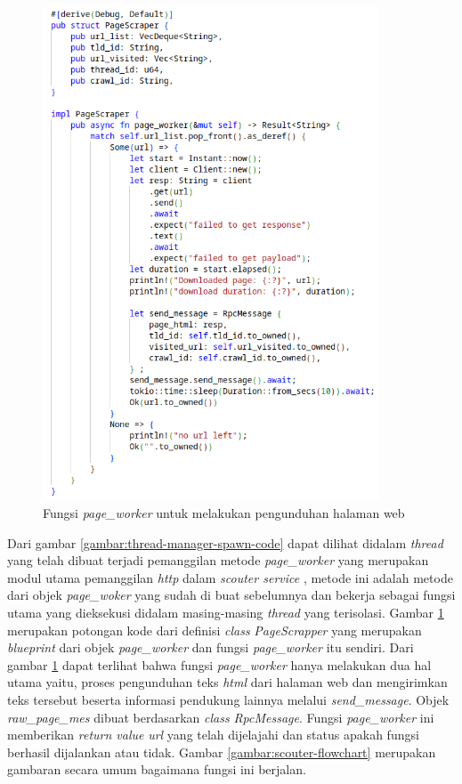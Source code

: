 \begin{figure}[H]
  \centering
  \includegraphics[keepaspectratio, width=10cm]{gambar/page_worker-code.png}
  \caption{ Fungsi \emph{page\_worker} untuk melakukan pengunduhan halaman web}
  \label{gambar:page-worker-code}
\end{figure}

Dari gambar \ref{gambar:thread-manager-spawn-code} dapat dilihat didalam \emph{thread} yang telah dibuat terjadi pemanggilan metode \emph{page\_worker} yang merupakan modul utama pemanggilan \emph{http} dalam \emph{scouter service} , metode ini adalah metode dari objek \emph{page\_woker} yang sudah di buat sebelumnya dan bekerja sebagai fungsi utama yang dieksekusi didalam masing-masing \emph{thread} yang terisolasi. Gambar \ref{gambar:page-worker-code} merupakan potongan kode dari definisi \emph{class} \emph{PageScrapper} yang merupakan \emph{blueprint} dari objek \emph{page\_worker} dan fungsi \emph{page\_worker} itu sendiri. Dari gambar \ref{gambar:page-worker-code} dapat terlihat bahwa fungsi \emph{page\_worker} hanya melakukan dua hal utama yaitu, proses pengunduhan teks \emph{html} dari halaman web dan mengirimkan teks tersebut beserta informasi pendukung lainnya melalui \emph{send\_message}. Objek \emph{raw\_page\_mes} dibuat berdasarkan \emph{class} \emph{RpcMessage}. Fungsi \emph{page\_worker} ini memberikan \emph{return value} \emph{url} yang telah dijelajahi dan status apakah fungsi berhasil dijalankan atau tidak. Gambar \ref{gambar:scouter-flowchart} merupakan gambaran secara umum bagaimana fungsi ini berjalan.

